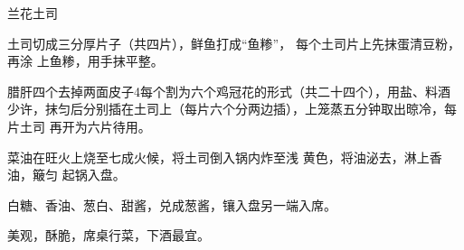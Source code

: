 \begin{recipe}{兰花土司}

\ingredients


\cooking

土司切成三分厚片子（共四片），鲜鱼打成“鱼糁”， 每个土司片上先抹蛋清豆粉，再涂
上鱼糁，用手抹平整。

\step 腊肝四个去掉两面皮子4每个割为六个鸡冠花的形式（共二十四个），用盐、料酒
少许，抹匀后分别插在土司上（每片六个分两边插），上笼蒸五分钟取出晾冷，每片土司
再开为六片待用。

菜油在旺火上烧至七成火候，将土司倒入锅内炸至浅 黄色，将油泌去，淋上香油，簸匀
起锅入盘。

\step 白糖、香油、葱白、甜酱，兑成葱酱，镶入盘另一端入席。

\features

美观，酥脆，席桌行菜，下酒最宜。

\end{recipe}

